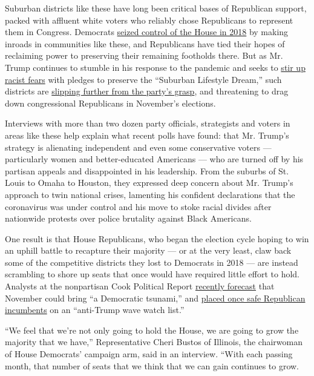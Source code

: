 Suburban districts like these have long been critical bases of
Republican support, packed with affluent white voters who reliably chose
Republicans to represent them in Congress. Democrats
\href{https://www.nytimes.com/2018/11/06/us/politics/midterm-elections-results.html}{seized
control of the House in 2018} by making inroads in communities like
these, and Republicans have tied their hopes of reclaiming power to
preserving their remaining footholds there. But as Mr. Trump continues
to stumble in his response to the pandemic and seeks to
\href{https://www.nytimes.com/2020/07/29/us/politics/trump-suburbs-housing-white-voters.html}{stir
up racist fears} with pledges to preserve the ``Suburban Lifestyle
Dream,'' such districts are
\href{https://www.nytimes.com/2020/07/10/us/politics/trump-white-voters-in-suburbs.html}{slipping
further from the party's grasp}, and threatening to drag down
congressional Republicans in November's elections.

Interviews with more than two dozen party officials, strategists and
voters in areas like these help explain what recent polls have found:
that Mr. Trump's strategy is alienating independent and even some
conservative voters --- particularly women and better-educated Americans
--- who are turned off by his partisan appeals and disappointed in his
leadership. From the suburbs of St. Louis to Omaha to Houston, they
expressed deep concern about Mr. Trump's approach to twin national
crises, lamenting his confident declarations that the coronavirus was
under control and his move to stoke racial divides after nationwide
protests over police brutality against Black Americans.

One result is that House Republicans, who began the election cycle
hoping to win an uphill battle to recapture their majority --- or at the
very least, claw back some of the competitive districts they lost to
Democrats in 2018 --- are instead scrambling to shore up seats that once
would have required little effort to hold. Analysts at the nonpartisan
Cook Political Report
\href{https://cookpolitical.com/analysis/national/national-politics/new-july-2020-electoral-college-ratings}{recently
forecast} that November could bring ``a Democratic tsunami,'' and
\href{https://twitter.com/Redistrict/status/1284116710866538496?s=20}{placed
once safe Republican incumbents} on an ``anti-Trump wave watch list.''

``We feel that we're not only going to hold the House, we are going to
grow the majority that we have,'' Representative Cheri Bustos of
Illinois, the chairwoman of House Democrats' campaign arm, said in an
interview. ``With each passing month, that number of seats that we think
that we can gain continues to grow.

